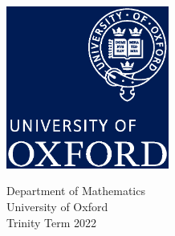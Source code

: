 \documentclass[../dissertation.tex]{subfiles}
\begin{document}
\begin{titlepage}
    \begin{center}
        \vspace*{1cm}

        \Huge
        \textbf{\titlename}

        \vspace{0.5cm}

        \vspace{1.5cm}


        \vfill



        \includegraphics[width=0.4\textwidth]{oxfordlogo}

        \vspace{0.34\textheight}

        \large
        Department of Mathematics\\
        University of Oxford\\
        Trinity Term 2022

    \end{center}
\end{titlepage}
\end{document}
